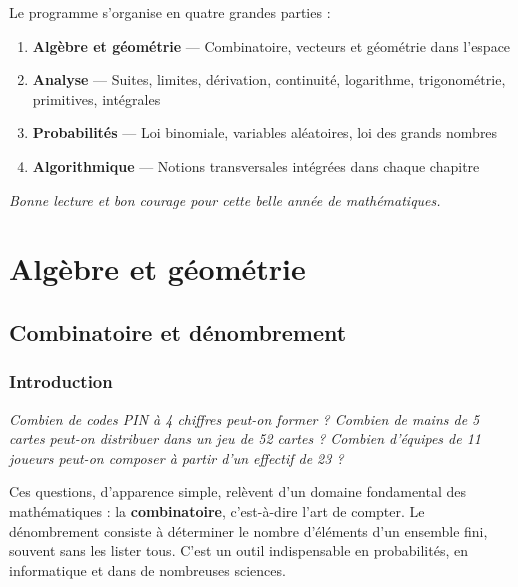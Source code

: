 \documentclass[12pt,a4paper,twoside]{book}
\begin{document}
\medskip

Le programme s'organise en quatre grandes parties :
\begin{enumerate}
  \item \textbf{Algèbre et géométrie} — Combinatoire, vecteurs et géométrie dans l'espace
  \item \textbf{Analyse} — Suites, limites, dérivation, continuité, logarithme, trigonométrie, primitives, intégrales
  \item \textbf{Probabilités} — Loi binomiale, variables aléatoires, loi des grands nombres
  \item \textbf{Algorithmique} — Notions transversales intégrées dans chaque chapitre
\end{enumerate}

\medskip

\textit{Bonne lecture et bon courage pour cette belle année de mathématiques.}

%
%

\part{Algèbre et géométrie}


\chapter{Combinatoire et dénombrement}

\section*{Introduction}

\textit{Combien de codes PIN à 4 chiffres peut-on former ? Combien de mains de 5 cartes peut-on distribuer dans un jeu de 52 cartes ? Combien d'équipes de 11 joueurs peut-on composer à partir d'un effectif de 23 ?}

\medskip

Ces questions, d'apparence simple, relèvent d'un domaine fondamental des mathématiques : la \textbf{combinatoire}, c'est-à-dire l'art de compter. Le dénombrement consiste à déterminer le nombre d'éléments d'un ensemble fini, souvent sans les lister tous. C'est un outil indispensable en probabilités, en informatique et dans de nombreuses sciences.
\end{document}
